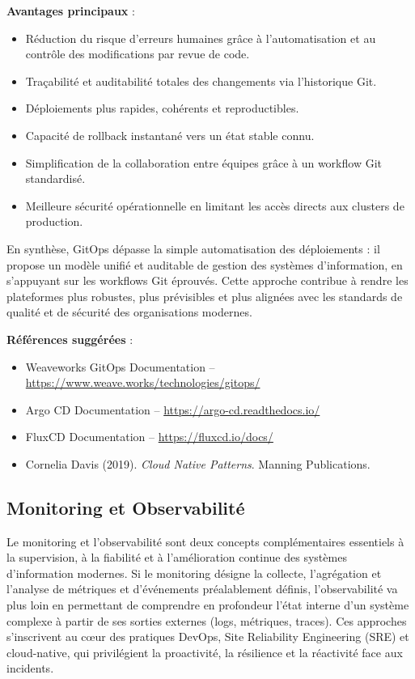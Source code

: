 \textbf{Avantages principaux} :
\begin{itemize}
	\item Réduction du risque d’erreurs humaines grâce à l’automatisation et au contrôle des modifications par revue de code.
	\item Traçabilité et auditabilité totales des changements via l’historique Git.
	\item Déploiements plus rapides, cohérents et reproductibles.
	\item Capacité de rollback instantané vers un état stable connu.
	\item Simplification de la collaboration entre équipes grâce à un workflow Git standardisé.
	\item Meilleure sécurité opérationnelle en limitant les accès directs aux clusters de production.
\end{itemize}

En synthèse, GitOps dépasse la simple automatisation des déploiements : il propose un modèle unifié et auditable de gestion des systèmes d’information, en s’appuyant sur les workflows Git éprouvés. Cette approche contribue à rendre les plateformes plus robustes, plus prévisibles et plus alignées avec les standards de qualité et de sécurité des organisations modernes.

\textbf{Références suggérées} :
\begin{itemize}
	\item Weaveworks GitOps Documentation – \url{https://www.weave.works/technologies/gitops/}
	\item Argo CD Documentation – \url{https://argo-cd.readthedocs.io/}
	\item FluxCD Documentation – \url{https://fluxcd.io/docs/}
	\item Cornelia Davis (2019). \textit{Cloud Native Patterns}. Manning Publications.
\end{itemize}

\subsection{Monitoring et Observabilité}

Le monitoring et l’observabilité sont deux concepts complémentaires essentiels à la supervision, à la fiabilité et à l’amélioration continue des systèmes d’information modernes. Si le monitoring désigne la collecte, l’agrégation et l’analyse de métriques et d’événements préalablement définis, l’observabilité va plus loin en permettant de comprendre en profondeur l’état interne d’un système complexe à partir de ses sorties externes (logs, métriques, traces). Ces approches s’inscrivent au cœur des pratiques DevOps, Site Reliability Engineering (SRE) et cloud-native, qui privilégient la proactivité, la résilience et la réactivité face aux incidents.

